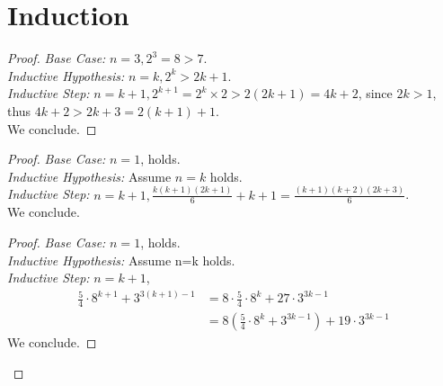 \documentclass{article}
\begin{document}
    \part*{Induction}
    \begin{enumerate}[(a).]
        \item \begin{proof}
            \emph{Base Case: }$n=3, 2^3=8>7$.\\
            \emph{Inductive Hypothesis: }$n=k,2^k>2k+1$.\\
            \emph{Inductive Step: }$n=k+1,2^{k+1}=2^k \times 2>2(2k+1)=4k+2$, since 
            $2k>1$, thus $4k+2>2k+3=2(k+1)+1$.\\
            We conclude.
        \end{proof}

        \item \begin{proof}
            \emph{Base Case: }$n=1$, holds.\\
            \emph{Inductive Hypothesis: }Assume $n=k$ holds.\\
            \emph{Inductive Step: }$n=k+1,\frac{k(k+1)(2k+1)}{6}+k+1=\frac{(k+1)(k+2)(2k+3)}{6}$.\\
            We conclude.

        
        \item \begin{proof}
            \emph{Base Case: }$n=1$, holds.\\
            \emph{Inductive Hypothesis: }Assume n=k holds.\\
            \emph{Inductive Step: }$n=k+1$,\\
            \begin{align*}
                \frac{5}{4}\cdot 8^{k+1} + 3^{3(k+1)-1}&=
                8\cdot \frac{5}{4}\cdot 8^k + 27\cdot 3^{3k-1}\\
                &=8(\frac{5}{4}\cdot 8^k + 3^{3k-1}) + 19\cdot 3^{3k-1}
            \end{align*} 
            We conclude.
        \end{proof}
        \end{proof}
    \end{enumerate}
\end{document}
